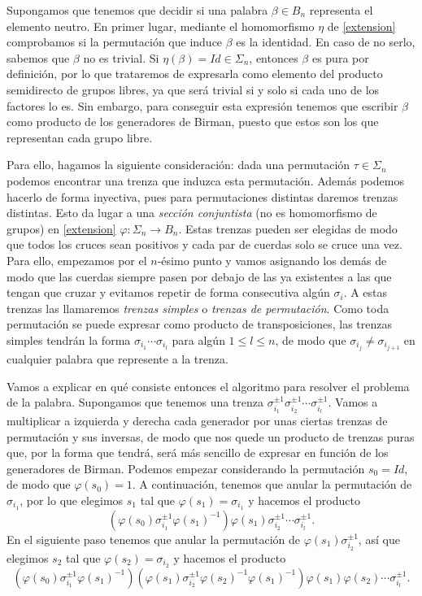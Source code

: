 \documentclass[TFG.tex]{subfiles}
\begin{document}
Supongamos que tenemos que decidir si una palabra $\beta\in B_n$ representa el elemento neutro. En primer lugar, mediante el homomorfismo $\eta$ de \ref{extension} comprobamos si la permutación que induce $\beta$ es la identidad. En caso de no serlo, sabemos que $\beta$ no es trivial. Si $\eta(\beta)=Id\in\Sigma_n$, entonces $\beta$ es pura por definición, por lo que trataremos de expresarla como elemento del producto semidirecto de grupos libres, ya que será trivial si y solo si cada uno de los factores lo es. Sin embargo, para conseguir esta expresión tenemos que escribir $\beta$ como producto de los generadores de Birman, puesto que estos son los que representan cada grupo libre.

Para ello, hagamos la siguiente consideración: dada una permutación $\tau\in\Sigma_n$ podemos encontrar una trenza que induzca esta permutación. Además podemos hacerlo de forma inyectiva, pues para permutaciones distintas daremos trenzas distintas. Esto da lugar a una \emph{sección conjuntista} (no es homomorfismo de grupos) en \ref{extension} $\varphi:\Sigma_n\to B_n$. Estas trenzas pueden ser elegidas de modo que todos los cruces sean positivos y cada par de cuerdas solo se cruce una vez. Para ello, empezamos por el $n$-ésimo punto y vamos asignando los demás de modo que las cuerdas siempre pasen por debajo de las ya existentes a las que tengan que cruzar y evitamos repetir de forma consecutiva algún $\sigma_i$. A estas trenzas las llamaremos \emph{trenzas simples} o \emph{trenzas de permutación}. Como toda permutación se puede expresar como producto de transposiciones, las trenzas simples tendrán la forma $\sigma_{i_1}\cdots\sigma_{i_l}$ para algún $1\leq l\leq n$, de modo que $\sigma_{i_j}\neq\sigma_{i_{j+1}}$ en cualquier palabra que represente a la trenza.  


Vamos a explicar en qué consiste entonces el algoritmo para resolver el problema de la palabra. Supongamos que tenemos una trenza $\sigma_{i_1}^{\pm 1}\sigma_{i_2}^{\pm 1}\cdots\sigma_{i_l}^{\pm 1}$. Vamos a multiplicar a izquierda y derecha cada generador por unas ciertas trenzas de permutación y sus inversas, de modo que nos quede un producto de trenzas puras que, por la forma que tendrá, será más sencillo de expresar en función de los generadores de Birman. Podemos empezar considerando la permutación $s_0=Id$, de modo que $\varphi(s_0)=1$. A continuación, tenemos que anular la permutación de $\sigma_{i_1}$, por lo que elegimos $s_1$ tal que $\varphi(s_1)=\sigma_{i_1}$ y hacemos el producto
\[
(\varphi(s_0)\sigma_{i_1}^{\pm 1}\varphi(s_1)^{-1})\varphi(s_1)\sigma_{i_2}^{\pm 1}\cdots\sigma_{i_l}^{\pm 1}.
\]
En el siguiente paso tenemos que anular la permutación de $\varphi(s_1)\sigma_{i_2}^{\pm 1}$, así que elegimos $s_2$ tal que $\varphi(s_2)=\sigma_{i_2}$ y hacemos el producto
\[
(\varphi(s_0)\sigma_{i_1}^{\pm 1}\varphi(s_1)^{-1})(\varphi(s_1)\sigma_{i_2}^{\pm 1}\varphi(s_2)^{-1}\varphi(s_1)^{-1})\varphi(s_1)\varphi(s_2)\cdots\sigma_{i_l}^{\pm 1}.
\]
\end{document}
